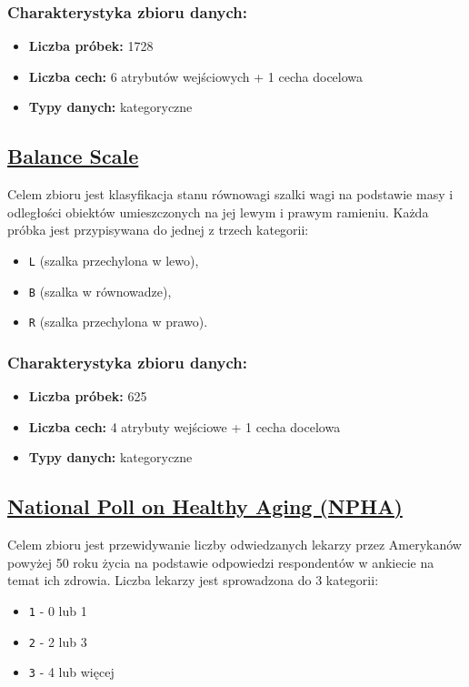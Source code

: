\documentclass{article}
\begin{document}
\subsubsection*{Charakterystyka zbioru danych:}
\begin{itemize}
    \item \textbf{Liczba próbek:} 1728
    \item \textbf{Liczba cech:} 6 atrybutów wejściowych + 1 cecha docelowa
    \item \textbf{Typy danych:} kategoryczne
\end{itemize}

\subsection{\href{https://archive.ics.uci.edu/dataset/12/balance+scale}{Balance Scale}}

Celem zbioru jest klasyfikacja stanu równowagi szalki wagi na podstawie masy i odległości obiektów umieszczonych na jej lewym i prawym ramieniu. Każda próbka jest przypisywana do jednej z trzech kategorii:
\begin{itemize}
    \item \texttt{L} (szalka przechylona w lewo),
    \item \texttt{B} (szalka w równowadze),
    \item \texttt{R} (szalka przechylona w prawo).
\end{itemize}

\subsubsection*{Charakterystyka zbioru danych:}

\begin{itemize}
    \item \textbf{Liczba próbek:} 625
    \item \textbf{Liczba cech:} 4 atrybuty wejściowe + 1 cecha docelowa
    \item \textbf{Typy danych:} kategoryczne
\end{itemize}

\subsection{\href{https://archive.ics.uci.edu/dataset/936/national+poll+on+healthy+aging+(npha)}{National Poll on Healthy Aging (NPHA)}}

Celem zbioru jest przewidywanie liczby odwiedzanych lekarzy przez Amerykanów powyżej 50 roku życia na podstawie odpowiedzi respondentów w ankiecie na temat ich zdrowia. Liczba lekarzy jest sprowadzona do 3 kategorii:
\begin{itemize}
    \item \texttt{1} - 0 lub 1
    \item \texttt{2} - 2 lub 3
    \item \texttt{3} - 4 lub więcej
\end{itemize}
\end{document}
